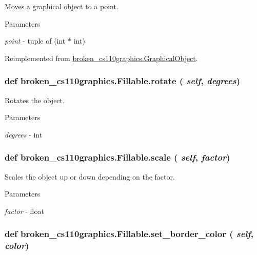 Moves a graphical object to a point. 
\begin{DoxyParams}{Parameters}
\item[{\em point}]-\/ tuple of (int $\ast$ int) \end{DoxyParams}


Reimplemented from \hyperlink{classbroken__cs110graphics_1_1GraphicalObject_ad41f02c6b8a874f21ca63bcb6a0320c5}{broken\_\-cs110graphics.GraphicalObject}.\hypertarget{classbroken__cs110graphics_1_1Fillable_a93eddaabc3656044675e6b525c903ada}{
\subsubsection[{rotate}]{\setlength{\rightskip}{0pt plus 5cm}def broken\_\-cs110graphics.Fillable.rotate ( {\em self}, \/   {\em degrees})}}
\label{classbroken__cs110graphics_1_1Fillable_a93eddaabc3656044675e6b525c903ada}


Rotates the object. 
\begin{DoxyParams}{Parameters}
\item[{\em degrees}]-\/ int \end{DoxyParams}
\hypertarget{classbroken__cs110graphics_1_1Fillable_a054b40e148c8052e7fe2b1f45749802b}{
\subsubsection[{scale}]{\setlength{\rightskip}{0pt plus 5cm}def broken\_\-cs110graphics.Fillable.scale ( {\em self}, \/   {\em factor})}}
\label{classbroken__cs110graphics_1_1Fillable_a054b40e148c8052e7fe2b1f45749802b}


Scales the object up or down depending on the factor. 
\begin{DoxyParams}{Parameters}
\item[{\em factor}]-\/ float \end{DoxyParams}
\hypertarget{classbroken__cs110graphics_1_1Fillable_a0c0ae1c5c92000354837bc3060de6962}{
\subsubsection[{set\_\-border\_\-color}]{\setlength{\rightskip}{0pt plus 5cm}def broken\_\-cs110graphics.Fillable.set\_\-border\_\-color ( {\em self}, \/   {\em color})}}
\label{classbroken__cs110graphics_1_1Fillable_a0c0ae1c5c92000354837bc3060de6962}


